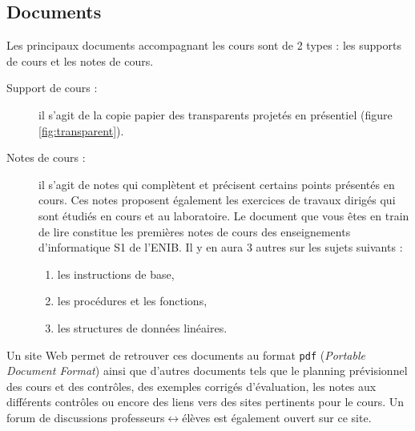 \subsection{Documents}
Les principaux documents accompagnant les cours sont de 2 types : 
les supports de cours et les notes de cours.
\begin{description}
\item[Support de cours :] \mbox{}
	il s'agit de la copie papier des transparents projetés
	en présentiel (figure \ref{fig:transparent}). 
\item[Notes de cours :] il s'agit de notes qui complètent et
	précisent certains points présentés en cours. Ces notes proposent
	également les exercices de travaux dirigés qui sont étudiés
	en cours et au laboratoire. Le document que vous 
	êtes en train de lire constitue les premières notes de cours
	des enseignements d'informatique S1 de l'ENIB. Il y en aura 3 autres 
	sur les sujets suivants :
	\begin{enumerate}
	\item les instructions de base,
	\item les procédures et les fonctions,
	\item les structures de données linéaires.
	\end{enumerate}
\end{description}

Un site {\sc Web} permet de retrouver ces documents au format {\tt pdf} 
({\em Portable Document Format}) ainsi que d'autres documents tels que
le planning prévisionnel des cours et des contrôles, des exemples corrigés 
d'évaluation, les notes aux différents contrôles ou encore des liens vers 
des sites pertinents pour le cours. 
Un forum de discussions professeurs$\leftrightarrow$élèves
est également ouvert sur ce site.

